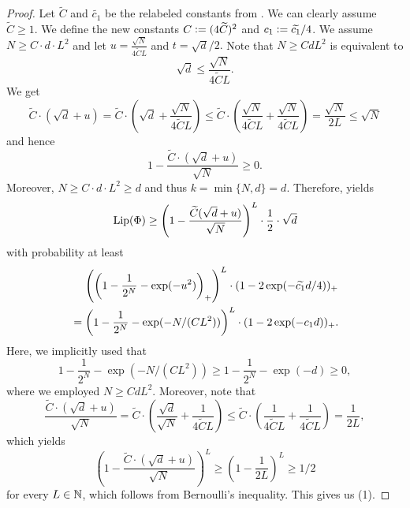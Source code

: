 \renewcommand*{\proofname}{Proof of \Cref{thm:main_3}}
\begin{proof}
Let $\widetilde{C}$ and $\widetilde{c_1}$ be the relabeled constants from . We can clearly assume $\widetilde{C} \geq 1$. We define the new constants $C \mathrel{\mathop:}= (4\widetilde{C} )^2$ and $c_1 \mathrel{\mathop:}= \widetilde{c_1}/4$. We assume $N \geq C \cdot d \cdot L^2$ and let $u = \frac{\sqrt{N}}{4\widetilde{C}L}$ and $t = \sqrt{d}/2.$ Note that $N \geq CdL^2$ is equivalent to
\begin{equation*}
\sqrt{d} \leq \frac{\sqrt{N}}{4\widetilde{C}L}.
\end{equation*}
We get
\begin{equation*}
\widetilde{C} \cdot \left(\sqrt{d} + u\right) =\widetilde{C} \cdot \left(\sqrt{d} + \frac{\sqrt{N}}{4\widetilde{C}L}\right) \leq \widetilde{C} \cdot \left(\frac{\sqrt{N}}{4\widetilde{C}L} + \frac{\sqrt{N}}{4\widetilde{C}L}\right) = \frac{\sqrt{N}}{2L} \leq \sqrt{N}
\end{equation*}
and hence
\begin{equation*}
1 - \frac{\widetilde{C}\cdot (\sqrt{d} + u)}{\sqrt{N}} \geq 0.
\end{equation*}
Moreover, $N \geq C \cdot d \cdot L^2 \geq d$ and thus $k = \min \{N,d\} = d$. 
Therefore,  yields
\begin{equation*}
\operatorname{Lip}(\Phi)\geq \left(1 - \frac{\widetilde{C}(\sqrt{d}+u) }{\sqrt{N}}\right)^{L} \cdot \frac{1}{2} \cdot \sqrt{d}
\end{equation*}
with probability at least 
\begin{align*}
&\norel\left(\left(1 -  \frac{1}{2^N}-\exp(-u^2)\right)_+\right)^L \cdot (1- 2 \exp (-\widetilde{c_1} d / 4))_+\\
&= \left(1 - \frac{1}{2^N}-\exp(-N/(CL^2))\right)^L \cdot (1- 2 \exp (-c_1 d ))_+.
\end{align*} 
Here, we implicitly used that 
\begin{equation*}
1 - \frac{1}{2^N}-\exp(-N/(CL^2)) \geq 1 - \frac{1}{2^N} - \exp(-d) \geq 0,
\end{equation*}
where we employed $N \geq CdL^2$.
Moreover, note that 
\begin{equation*}
\frac{\widetilde{C}\cdot (\sqrt{d} + u)}{\sqrt{N}} = \widetilde{C} \cdot \left(\frac{\sqrt{d}}{\sqrt{N}} + \frac{1}{4\widetilde{C}L}\right) \leq \widetilde{C} \cdot \left(\frac{1}{4\widetilde{C}L}+\frac{1}{4\widetilde{C}L}\right) = \frac{1}{2L},
\end{equation*}
which yields
\begin{equation*}
 \left(1 - \frac{\widetilde{C}\cdot (\sqrt{d}+u) }{\sqrt{N}}\right)^{L} \geq \left( 1 - \frac{1}{2L}\right)^L \geq 1/2 
\end{equation*}
for every $L \in \mathbb{N}$, which follows from Bernoulli's inequality. This gives us (1).


\end{proof}
